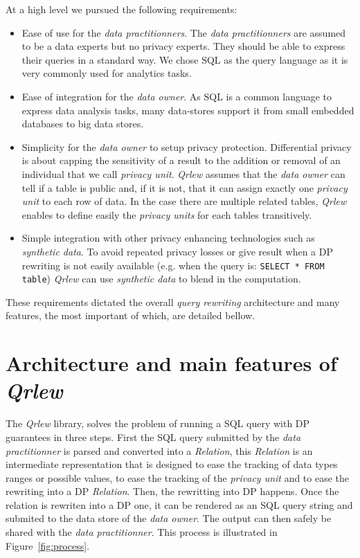 \documentclass[letterpaper]{article} %
\newcommand{\qrlew}{\emph{Qrlew}}
\begin{document}
At a high level we pursued the following requirements:
\begin{itemize}
    \item Ease of use for the \emph{data practitionners}. The \emph{data practitionners} are assumed to be a data experts but no privacy experts. They should be able to express their queries in a standard way. We chose SQL as the query language as it is very commonly used for analytics tasks.
    \item Ease of integration for the \emph{data owner}. As SQL is a common language to express data analysis tasks, many data-stores support it from small embedded databases to big data stores.
    \item Simplicity for the \emph{data owner} to setup privacy protection. Differential privacy is about capping the sensitivity of a result to the addition or removal of an individual that we call \emph{privacy unit}. \qrlew{} assumes that the \emph{data owner} can tell if a table is public and, if it is not, that it can assign exactly one \emph{privacy unit} to each row of data. In the case there are multiple related tables, \qrlew{} enables to define easily the \emph{privacy units} for each tables transitively.
    \item Simple integration with other privacy enhancing technologies such as \emph{synthetic data}. To avoid repeated privacy losses or give result when a DP rewriting is not easily available (e.g. when the query is: \texttt{SELECT * FROM table}) \qrlew{} can use \emph{synthetic data} to blend in the computation.
\end{itemize}

These requirements dictated the overall \emph{query rewriting} architecture and many features, the most important of which, are detailed bellow.

\section{Architecture and main features of \qrlew}

The \qrlew{} library, solves the problem of running a SQL query with DP guarantees in three steps. First the SQL query submitted by the \emph{data practitionner} is parsed and converted into a \emph{Relation}, this \emph{Relation} is an intermediate representation that is designed to ease the tracking of data types ranges or possible values, to ease the tracking of the \emph{privacy unit} and to ease the rewriting into a DP \emph{Relation}. Then, the rewritting into DP happens. Once the relation is rewriten into a DP one, it can be rendered as an SQL query string and submited to the data store of the \emph{data owner}. The output can then safely be shared with the \emph{data practitionner}. This process is illustrated in Figure~\ref{fig:process}.
\end{document}
